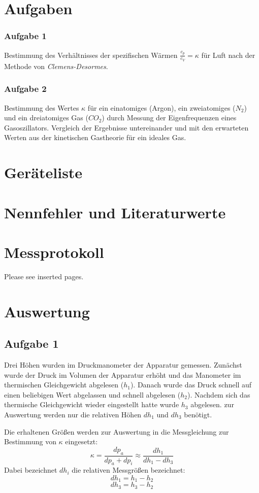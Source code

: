 \documentclass[%
   final,      %
   paper=a4, paper=portrait, pagesize=auto, %
   fontsize=11pt, %
   ngerman, %
 ]{scrartcl} %
\begin{document}
\section{Aufgaben}
\subsubsection{Aufgabe 1}
Bestimmung des Verhältnisses der spezifischen Wärmen $\frac{c_p}{c_V} = \kappa$ für Luft nach der Methode von \emph{Clemens-Desormes}.
\subsubsection{Aufgabe 2}
Bestimmung des Wertes $\kappa$ für ein einatomiges (Argon), ein zweiatomiges ($N_2$) und ein dreiatomiges Gas ($CO_2$) durch Messung der Eigenfrequenzen eines Gasoszillators.
Vergleich der Ergebnisse untereinander und mit den erwarteten Werten aus der kinetischen Gastheorie für ein ideales Gas.
\section{Geräteliste}
\section{Nennfehler und Literaturwerte}
\section{Messprotokoll}
Please see inserted pages.
\section{Auswertung}
\subsection{Aufgabe 1}
Drei Höhen wurden im Druckmanometer der Apparatur gemessen. Zunächst wurde der Druck im Volumen der Apparatur erhöht und das Manometer im thermischen Gleichgewicht abgelesen ($h_1$). Danach wurde das Druck schnell auf einen beliebigen Wert abgelassen und schnell abgelesen ($h_2$). Nachdem sich das thermische Gleichgewicht wieder eingestellt hatte wurde $h_3$ abgelesen. zur Auswertung werden nur die relativen Höhen $dh_1$ und $dh_3$ benötigt.

Die erhaltenen Größen werden zur Auswertung in die Messgleichung zur Bestimmung von $\kappa$ eingesetzt:
\begin{equation}
\kappa = \frac{dp_a}{dp_a + dp_i}\approx \frac{dh_1}{dh_1 - dh_3}
\end{equation}
Dabei bezeichnet $dh_i$ die relativen Messgrößen bezeichnet:
\[dh_1 = h_1 - h_2\]
\[dh_3 = h_3 - h_2\]
\end{document}
